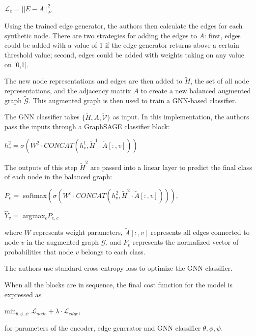 \documentclass{article}
\begin{document}
\begin{center}
$\mathcal{L}_e = ||E - A||^2_F$
\end{center}

Using the trained edge generator, the authors then calculate the edges for each synthetic node. There are two strategies for adding the edges to $A$: first, edges could be added with a value of 1 if the edge generator returns above a certain threshold value; second, edges could be added with weights taking on any value on [0,1].

The new node representations and edges are then added to $\tilde{H}$, the set of all node representations, and the adjacency matrix $A$ to create a new balanced augmented graph $\tilde{\mathcal{G}}$. This augmented graph is then used to train a GNN-based classifier. 

The GNN classifier takes $\{\tilde{H}, A, \tilde{\mathcal{V}}\}$ as input. In this implementation, the authors pass the inputs through a GraphSAGE classifier block:

\begin{center}
$h^2_v = \sigma(W^2 \cdot CONCAT(h^1_v, \tilde{H}^1 \cdot \tilde{A}[:,v]))$
\end{center}

The outputs of this step $\tilde{H}^2$ are passed into a linear layer to predict the final class of each node in the balanced graph:

\begin{center}
$P_v = $ softmax$(\sigma(W^c \cdot CONCAT(h^2_v, \tilde{H}^2 \cdot \tilde{A}[:,v])))$,

$\hat{Y}_v = $ argmax$_c P_{v,c}$
\end{center}

where $W$ represents weight parameters, $\tilde{A}[:,v]$ represents all edges connected to node $v$ in the augmented graph $\mathcal{G}$, and $P_v$ represents the normalized vector of probabilities that node $v$ belongs to each class. 

The authors use standard cross-entropy loss to optimize the GNN classifier. 

When all the blocks are in sequence, the final cost function for the model is expressed as

\begin{center}
min$_{\theta,\phi,\psi}$ $\mathcal{L}_{node} + \lambda \cdot \mathcal{L}_{edge}$,
\end{center}

for parameters of the encoder, edge generator and GNN classifier $\theta,\phi,\psi$.
\end{document}
